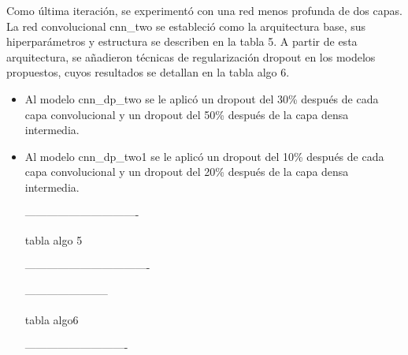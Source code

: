 Como última iteración, se experimentó con una red menos profunda de dos capas. La red convolucional cnn\_two se estableció como la arquitectura base, sus hiperparámetros y estructura se describen en la tabla 5. A partir de esta arquitectura, se añadieron técnicas de regularización dropout en los modelos propuestos, cuyos resultados se detallan en la tabla algo 6.

\begin{itemize}

\item Al modelo cnn\_dp\_two se le aplicó un dropout del 30\% después de cada capa convolucional y un dropout del 50\% después de la capa densa intermedia.

\item Al modelo cnn\_dp\_two1 se le aplicó un dropout del 10\% después de cada capa convolucional y un dropout del 20\% después de la capa densa intermedia.


-------------------------------

tabla algo 5

----------------------------------


-----------------------

tabla algo6

----------------------------
\end{itemize}